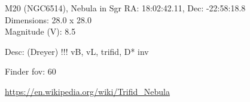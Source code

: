 \begin{block}{M20 (NGC6514), Nebula in Sgr}
    RA: 18:02:42.11, Dec: -22:58:18.8 \\ 
    Dimensions: 28.0 x 28.0 \\ 
    Magnitude (V): 8.5


    Desc: (Dreyer) !!! vB, vL, trifid, D* inv 

    Finder fov: 60 

    \url{https://en.wikipedia.org/wiki/Trifid_Nebula} 
\end{block}